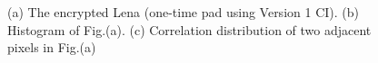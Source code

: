 \begin{figure}
\caption{(a) The encrypted Lena (one-time pad using Version 1 CI). (b) Histogram of Fig.(a). (c) Correlation distribution of two adjacent pixels in Fig.(a)}
\label{Old_CI}
\end{figure}
%
